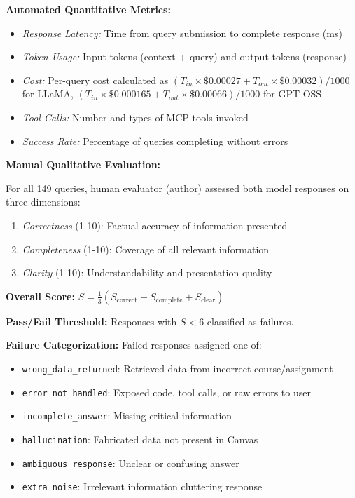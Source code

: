 \documentclass{article}
\begin{document}
\textbf{Automated Quantitative Metrics:}

\begin{itemize}
    \item \textit{Response Latency:} Time from query submission to complete response (ms)
    \item \textit{Token Usage:} Input tokens (context + query) and output tokens (response)
    \item \textit{Cost:} Per-query cost calculated as $(T_{in} \times \$0.00027 + T_{out} \times \$0.00032) / 1000$ for LLaMA, $(T_{in} \times \$0.000165 + T_{out} \times \$0.00066) / 1000$ for GPT-OSS
    \item \textit{Tool Calls:} Number and types of MCP tools invoked
    \item \textit{Success Rate:} Percentage of queries completing without errors
\end{itemize}

\textbf{Manual Qualitative Evaluation:}

For all 149 queries, human evaluator (author) assessed both model responses on three dimensions:

\begin{enumerate}
    \item \textit{Correctness} (1-10): Factual accuracy of information presented
    \item \textit{Completeness} (1-10): Coverage of all relevant information
    \item \textit{Clarity} (1-10): Understandability and presentation quality
\end{enumerate}

\textbf{Overall Score:} $S = \frac{1}{3}(S_{\text{correct}} + S_{\text{complete}} + S_{\text{clear}})$

\textbf{Pass/Fail Threshold:} Responses with $S < 6$ classified as failures.

\textbf{Failure Categorization:} Failed responses assigned one of:
\begin{itemize}
    \item \texttt{wrong\_data\_returned}: Retrieved data from incorrect course/assignment
    \item \texttt{error\_not\_handled}: Exposed code, tool calls, or raw errors to user
    \item \texttt{incomplete\_answer}: Missing critical information
    \item \texttt{hallucination}: Fabricated data not present in Canvas
    \item \texttt{ambiguous\_response}: Unclear or confusing answer
    \item \texttt{extra\_noise}: Irrelevant information cluttering response
\end{itemize}
\end{document}
